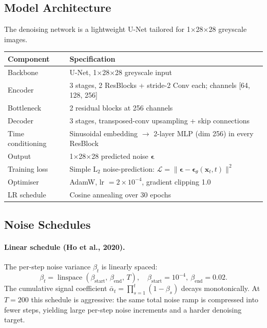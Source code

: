 \documentclass[11pt,a4paper]{article}
\begin{document}
\subsection{Model Architecture}

The denoising network is a lightweight U-Net tailored for 1$\times$28$\times$28
greyscale images.

\begin{center}
\begin{tabular}{ll}
\toprule
\textbf{Component} & \textbf{Specification}\\
\midrule
Backbone       & U-Net, 1$\times$28$\times$28 greyscale input\\
Encoder        & 3 stages, 2 ResBlocks + stride-2 Conv each; channels [64, 128, 256]\\
Bottleneck     & 2 residual blocks at 256 channels\\
Decoder        & 3 stages, transposed-conv upsampling + skip connections\\
Time conditioning & Sinusoidal embedding $\to$ 2-layer MLP (dim 256) in every ResBlock\\
Output         & 1$\times$28$\times$28 predicted noise $\boldsymbol\epsilon$\\
Training loss  & Simple L$_2$ noise-prediction: $\mathcal{L}=\|\boldsymbol\epsilon-
                  \boldsymbol\epsilon_\theta(\mathbf{x}_t,t)\|^2$\\
Optimiser      & AdamW, lr $=2\times10^{-4}$, gradient clipping 1.0\\
LR schedule    & Cosine annealing over 30 epochs\\
\bottomrule
\end{tabular}
\end{center}

\subsection{Noise Schedules}

\paragraph{Linear schedule \normalfont\small(Ho et al., 2020).}
The per-step noise variance $\beta_t$ is linearly spaced:
\begin{equation}
  \beta_t = \operatorname{linspace}(\beta_{\text{start}},\,\beta_{\text{end}},\,T),
  \quad \beta_{\text{start}}=10^{-4},\ \beta_{\text{end}}=0.02.
\end{equation}
The cumulative signal coefficient $\bar\alpha_t=\prod_{s=1}^t(1-\beta_s)$
decays monotonically. At $T=200$ this schedule is aggressive: the same total
noise ramp is compressed into fewer steps, yielding large per-step noise
increments and a harder denoising target.
\end{document}
